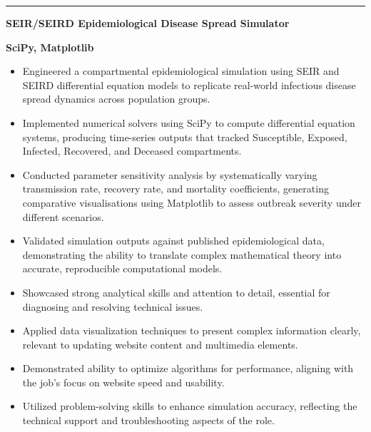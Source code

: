 \documentclass[11pt, a4paper]{article}
\begin{document}
\vspace{8pt}
\noindent%
{\color{DKGreen}\rule{4pt}{14pt}}\hspace{6pt}%
\textcolor{DarkTxt}{\textbf{\large SEIR/SEIRD Epidemiological Disease Spread Simulator}}\par
\vspace{1pt}
\noindent\hspace{10pt}\textcolor{DKGreen}{\textbf{\small SciPy, Matplotlib}}
\vspace{2pt}
\begin{itemize}
  \item \textcolor{MidTxt}{Engineered a compartmental epidemiological simulation using SEIR and SEIRD differential equation models to replicate real-world infectious disease spread dynamics across population groups.}
  \item \textcolor{MidTxt}{Implemented numerical solvers using SciPy to compute differential equation systems, producing time-series outputs that tracked Susceptible, Exposed, Infected, Recovered, and Deceased compartments.}
  \item \textcolor{MidTxt}{Conducted parameter sensitivity analysis by systematically varying transmission rate, recovery rate, and mortality coefficients, generating comparative visualisations using Matplotlib to assess outbreak severity under different scenarios.}
  \item \textcolor{MidTxt}{Validated simulation outputs against published epidemiological data, demonstrating the ability to translate complex mathematical theory into accurate, reproducible computational models.}
  \item \textcolor{MidTxt}{Showcased strong analytical skills and attention to detail, essential for diagnosing and resolving technical issues.}
  \item \textcolor{MidTxt}{Applied data visualization techniques to present complex information clearly, relevant to updating website content and multimedia elements.}
  \item \textcolor{MidTxt}{Demonstrated ability to optimize algorithms for performance, aligning with the job's focus on website speed and usability.}
  \item \textcolor{MidTxt}{Utilized problem-solving skills to enhance simulation accuracy, reflecting the technical support and troubleshooting aspects of the role.}
\end{itemize}
\vspace{2pt}
\end{document}
